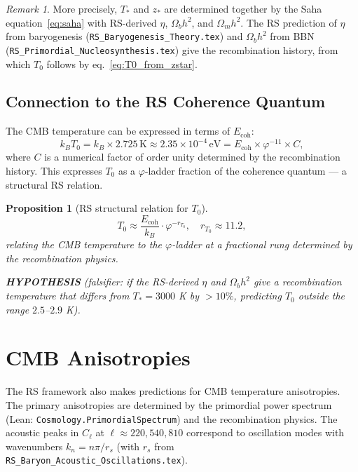 \documentclass[12pt,a4paper]{article}
\newtheorem{proposition}[theorem]{Proposition}
\theoremstyle{definition}
\theoremstyle{remark}
\newtheorem{remark}[theorem]{Remark}
\begin{document}
\begin{remark}
More precisely, $T_*$ and $z_*$ are determined together by the Saha
equation~\eqref{eq:saha} with RS-derived $\eta$, $\Omega_b h^2$, and
$\Omega_m h^2$.  The RS prediction of $\eta$ from baryogenesis
(\texttt{RS\_Baryogenesis\_Theory.tex}) and $\Omega_b h^2$ from BBN
(\texttt{RS\_Primordial\_Nucleosynthesis.tex}) give the recombination
history, from which $T_0$ follows by eq.~\eqref{eq:T0_from_zstar}.
\end{remark}

\subsection{Connection to the RS Coherence Quantum}

The CMB temperature can be expressed in terms of $E_\mathrm{coh}$:
\begin{equation}
  k_B T_0 = k_B \times 2.725\,\mathrm{K}
  \approx 2.35 \times 10^{-4}\,\mathrm{eV}
  = E_\mathrm{coh} \times \varphi^{-11} \times C,
  \label{eq:T0_Ecoh}
\end{equation}
where $C$ is a numerical factor of order unity determined by the
recombination history.  This expresses $T_0$ as a $\varphi$-ladder
fraction of the coherence quantum — a structural RS relation.

\begin{proposition}[RS structural relation for $T_0$]
\begin{equation}
  T_0 \approx \frac{E_\mathrm{coh}}{k_B}
  \cdot \varphi^{-r_{T_0}},
  \quad r_{T_0} \approx 11.2,
  \label{eq:T0_ladder}
\end{equation}
relating the CMB temperature to the $\varphi$-ladder at a fractional
rung determined by the recombination physics.

\textbf{HYPOTHESIS} (falsifier: if the RS-derived $\eta$ and $\Omega_b h^2$
give a recombination temperature that differs from $T_* = 3000$ K by
$> 10\%$, predicting $T_0$ outside the range $2.5$--$2.9$ K).
\end{proposition}

\section{CMB Anisotropies}

The RS framework also makes predictions for CMB temperature anisotropies.
The primary anisotropies are determined by the primordial power spectrum
(Lean: \texttt{Cosmology.PrimordialSpectrum}) and the recombination
physics.  The acoustic peaks in $C_\ell$ at $\ell \approx 220, 540, 810$
correspond to oscillation modes with wavenumbers $k_n = n\pi/r_s$
(with $r_s$ from \texttt{RS\_Baryon\_Acoustic\_Oscillations.tex}).
\end{document}
